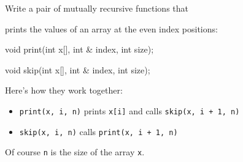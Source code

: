Write a pair of mutually recursive functions that

prints the values of an array at the even index positions:



\begin{consolethree}[escapeinside=||]

void print(int x[], int & index, int size);

void skip(int x[], int & index, int size);

\end{consolethree}



Here's how they work together:



\begin{itemize}

\item \texttt{print(x, i, n)} prints \texttt{x[i]} and calls \texttt{skip(x, i + 1, n)}

\item \texttt{skip(x, i, n)} calls \texttt{print(x, i + 1, n)}

\end{itemize}



Of course \texttt{n} is the size of the array \texttt{x}.

